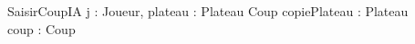 \begin{algorithme}
	\small
	\fonction
	{SaisirCoupIA}
	{j : Joueur, plateau : Plateau}
	{Coup}
    {copiePlateau : Plateau\\
    coup : Coup}
	{
    }
\end{algorithme}